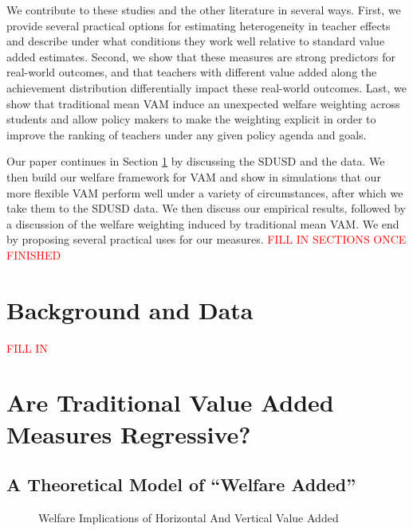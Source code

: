 \documentclass[letterpaper,12pt]{article}
\begin{document}
We contribute to these studies and the other literature in several ways. First, we provide several practical options for estimating heterogeneity in teacher effects and describe under what conditions they work well relative to standard value added estimates. Second, we show that these measures are strong predictors for real-world outcomes, and that teachers with different value added along the achievement distribution differentially impact these real-world outcomes. Last, we show that traditional mean VAM induce an unexpected welfare weighting across students and allow policy makers to make the weighting explicit in order to improve the ranking of teachers under any given policy agenda and goals.

Our paper continues in Section \ref{sec: Data} by discussing the SDUSD and the data. We then build our welfare framework for VAM and show in simulations that our more flexible VAM perform well under a variety of circumstances, after which we take them to the SDUSD data. We then discuss our empirical results, followed by a discussion of the welfare weighting induced by traditional mean VAM. We end by proposing several practical uses for our measures. \textcolor{red}{FILL IN SECTIONS ONCE FINISHED}




\section{Background and Data}\label{sec: Data}

\textcolor{red}{FILL IN}




\section{Are Traditional Value Added Measures Regressive?}\label{sec: Analysis}

\subsection{A Theoretical Model of ``Welfare Added''}

\begin{figure}
    \centering
    \caption{Welfare Implications of Horizontal And Vertical Value Added}
    \label{fig:my_label}
\end{figure}
\end{document}
